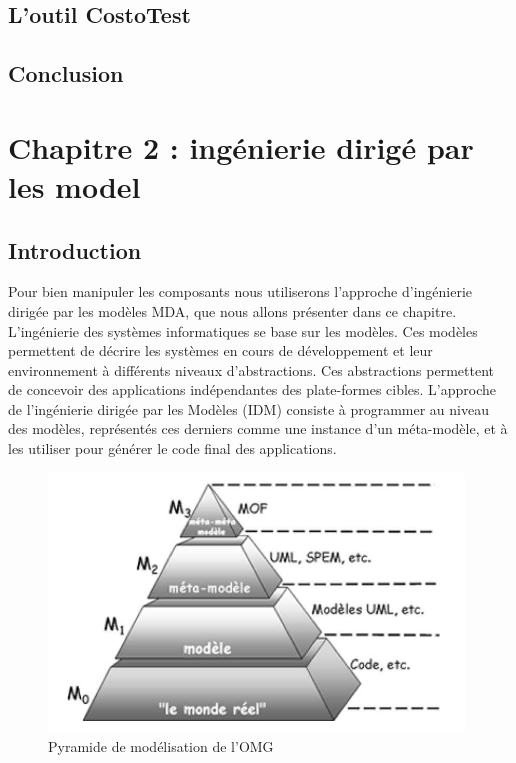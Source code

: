 \documentclass[
10pt, %
a4paper, %
oneside, %
headinclude,footinclude, %
BCOR5mm, %
]{report}
\begin{document}
	\section{L'outil CostoTest}
	\lipsum[5] %
	\section{Conclusion}
	\lipsum[10]		
								  
														
														
	\newpage 
	\chapter{Chapitre 2 : ingénierie dirigé par les model}
	\minitoc  
	\section{Introduction}
    Pour  bien manipuler les composants nous utiliserons l’approche d'ingénierie dirigée par les modèles MDA, que nous allons présenter dans ce chapitre.
    L’ingénierie  des systèmes informatiques se base sur les modèles. Ces modèles permettent de décrire les systèmes en cours de développement et leur environnement à différents niveaux d’abstractions. Ces abstractions permettent de concevoir des applications indépendantes des plate-formes cibles. 
    L’approche de l’ingénierie dirigée par les Modèles (IDM) consiste à programmer au niveau des modèles, représentés ces derniers comme une instance d’un méta-modèle, et à les utiliser pour générer le code final des applications.\\[1.5cm]
    
    \begin{figure}[H] 
    \centering     
		\includegraphics[scale=0.8]{Figures/Pyramide_de_modelisation.png}
		\caption{Pyramide de modélisation de l'OMG \citep{PyramideMDA}}
		\end{figure}  
    
\end{document}
